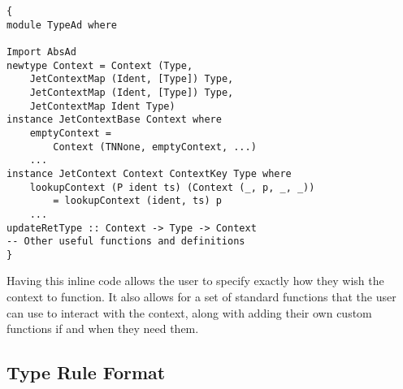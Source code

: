 \begin{lstlisting}[caption = Example of initial inline haskell code, label=lst:inlineHaskellCode]
{
module TypeAd where

Import AbsAd
newtype Context = Context (Type, 
    JetContextMap (Ident, [Type]) Type, 
    JetContextMap (Ident, [Type]) Type, 
    JetContextMap Ident Type)
instance JetContextBase Context where
    emptyContext = 
        Context (TNNone, emptyContext, ...)
    ...
instance JetContext Context ContextKey Type where
    lookupContext (P ident ts) (Context (_, p, _, _)) 
        = lookupContext (ident, ts) p
    ...
updateRetType :: Context -> Type -> Context
-- Other useful functions and definitions
}
\end{lstlisting}

Having this inline code allows the user to specify exactly how they wish the context to function.
It also allows for a set of standard functions that the user can use to interact with the context, along with adding their own custom functions if and when they need them.

\subsection{Type Rule Format}